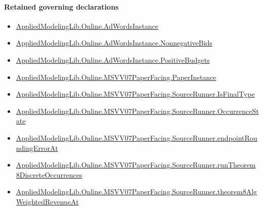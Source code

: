 \documentclass[10pt]{article}
\begin{document}
\paragraph{Retained governing declarations}
\begin{itemize}\raggedright
\item \hyperlink{governing-declaration-e5ce49672bf26ab1}{Applied\allowbreak{}Modeling\allowbreak{}Lib.\allowbreak{}Online.\allowbreak{}Ad\allowbreak{}Words\allowbreak{}Instance}
\item \hyperlink{governing-declaration-7bed8c5ff5e5cde7}{Applied\allowbreak{}Modeling\allowbreak{}Lib.\allowbreak{}Online.\allowbreak{}Ad\allowbreak{}Words\allowbreak{}Instance.\allowbreak{}Nonnegative\allowbreak{}Bids}
\item \hyperlink{governing-declaration-eabdcef9dca00922}{Applied\allowbreak{}Modeling\allowbreak{}Lib.\allowbreak{}Online.\allowbreak{}Ad\allowbreak{}Words\allowbreak{}Instance.\allowbreak{}Positive\allowbreak{}Budgets}
\item \hyperlink{governing-declaration-11907576ec71eeb5}{Applied\allowbreak{}Modeling\allowbreak{}Lib.\allowbreak{}Online.\allowbreak{}MSVV07\allowbreak{}Paper\allowbreak{}Facing.\allowbreak{}Paper\allowbreak{}Instance}
\item \hyperlink{paper-prerequisite-b03abe34f2413cec}{Applied\allowbreak{}Modeling\allowbreak{}Lib.\allowbreak{}Online.\allowbreak{}MSVV07\allowbreak{}Paper\allowbreak{}Facing.\allowbreak{}Source\allowbreak{}Runner.\allowbreak{}Is\allowbreak{}Final\allowbreak{}Type}
\item \hyperlink{governing-declaration-2eff7815f49c1d41}{Applied\allowbreak{}Modeling\allowbreak{}Lib.\allowbreak{}Online.\allowbreak{}MSVV07\allowbreak{}Paper\allowbreak{}Facing.\allowbreak{}Source\allowbreak{}Runner.\allowbreak{}Occurrence\allowbreak{}State}
\item \hyperlink{governing-declaration-d6b5c1d84fcfcbff}{Applied\allowbreak{}Modeling\allowbreak{}Lib.\allowbreak{}Online.\allowbreak{}MSVV07\allowbreak{}Paper\allowbreak{}Facing.\allowbreak{}Source\allowbreak{}Runner.\allowbreak{}endpoint\allowbreak{}Rounding\allowbreak{}Error\allowbreak{}At}
\item \hyperlink{governing-declaration-d071ebd3a5ae7962}{Applied\allowbreak{}Modeling\allowbreak{}Lib.\allowbreak{}Online.\allowbreak{}MSVV07\allowbreak{}Paper\allowbreak{}Facing.\allowbreak{}Source\allowbreak{}Runner.\allowbreak{}run\allowbreak{}Theorem8\allowbreak{}Discrete\allowbreak{}Occurrences}
\item \hyperlink{governing-declaration-58e15c5c9f71cb25}{Applied\allowbreak{}Modeling\allowbreak{}Lib.\allowbreak{}Online.\allowbreak{}MSVV07\allowbreak{}Paper\allowbreak{}Facing.\allowbreak{}Source\allowbreak{}Runner.\allowbreak{}theorem8\allowbreak{}Alg\allowbreak{}Weighted\allowbreak{}Revenue\allowbreak{}At}

\end{itemize}
\end{document}
